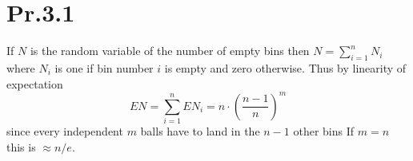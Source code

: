 \section*{Pr.3.1}

If $N$ is the random variable of the number of empty bins then
$N = \sum_{i=1}^n N_i$ where $N_i$ is one if bin number $i$ is empty
and zero otherwise. 
Thus by linearity of expectation
$$ E N = \sum_{i=1}^n E N_i = n \cdot \left(\frac{n-1}{n}\right)^m $$
since every independent $m$ balls have to land in the $n-1$ other bins
If $m = n$ this is $\approx n / e$.
